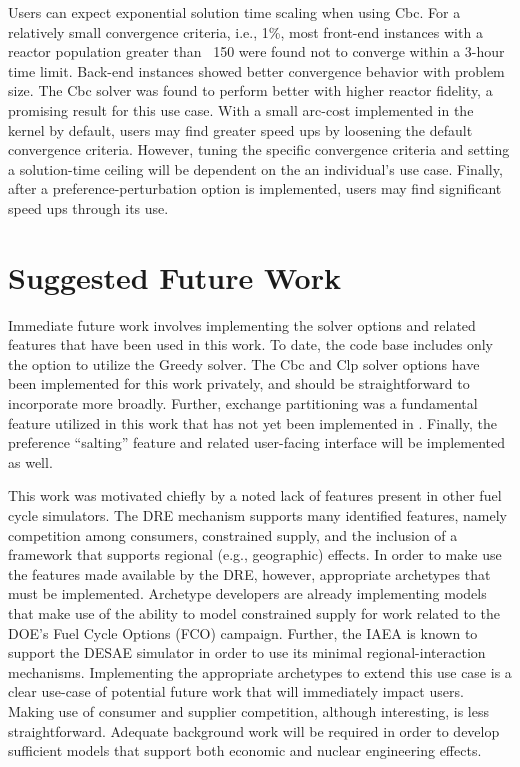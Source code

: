 Users can expect exponential solution time scaling when using Cbc. For a
relatively small convergence criteria, i.e., 1\%, most front-end instances with
a reactor population greater than ~150 were found not to converge within a
3-hour time limit. Back-end instances showed better convergence behavior with
problem size. The Cbc solver was found to perform better with higher reactor
fidelity, a promising result for this use case. With a small arc-cost
implemented in the kernel by default, users may find greater speed ups by
loosening the default convergence criteria. However, tuning the specific
convergence criteria and setting a solution-time ceiling will be dependent on
the an individual's use case. Finally, after a preference-perturbation option is
implemented, users may find significant speed ups through its use.

\section{Suggested Future Work}

Immediate future work involves implementing the solver options and related
features that have been used in this work. To date, the \Cyclus code base
includes only the option to utilize the Greedy solver. The Cbc and Clp solver
options have been implemented for this work privately, and should be
straightforward to incorporate more broadly. Further, exchange partitioning was
a fundamental feature utilized in this work that has not yet been implemented in
\Cyclus. Finally, the preference ``salting'' feature and related user-facing
interface will be implemented as well.

This work was motivated chiefly by a noted lack of features present in other
fuel cycle simulators. The DRE mechanism supports many identified features,
namely competition among consumers, constrained supply, and the inclusion of a
framework that supports regional (e.g., geographic) effects. In order to make
use the features made available by the DRE, however, \Cyclus appropriate
archetypes that must be implemented. Archetype developers are already
implementing models that make use of the ability to model constrained supply for
work related to the DOE's Fuel Cycle Options (FCO) campaign. Further, the IAEA
is known to support the DESAE simulator \cite{andrianova_desae_2008} in order to
use its minimal regional-interaction mechanisms. Implementing the appropriate
archetypes to extend this use case is a clear use-case of potential future work
that will immediately impact users. Making use of consumer and supplier
competition, although interesting, is less straightforward. Adequate background
work will be required in order to develop sufficient models that support both
economic and nuclear engineering effects.

